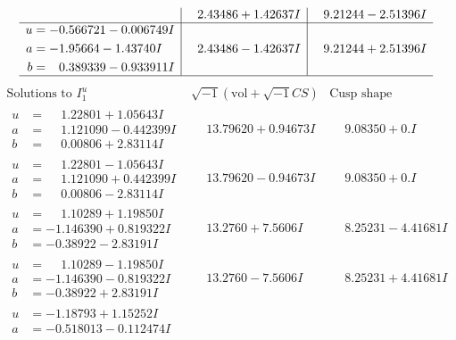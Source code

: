 \documentclass[1p]{elsarticle_modified}
\theoremstyle{definition}
\newcommand{\I}{\sqrt{-1}}
\begin{document}
$$\begin{array}{c|c|c}
 & \phantom{-}2.43486 + 1.42637 I & \phantom{-}9.21244 - 2.51396 I \\ \hline\begin{aligned}
u &= -0.566721 - 0.006749 I \\
a &= -1.95664 - 1.43740 I \\
b &= \phantom{-}0.389339 - 0.933911 I\end{aligned}
 & \phantom{-}2.43486 - 1.42637 I & \phantom{-}9.21244 + 2.51396 I\\
 \hline 
 \end{array}$$\newpage$$\begin{array}{c|c|c}  
\text{Solutions to }I^u_{1}& \I (\text{vol} + \sqrt{-1}CS) & \text{Cusp shape}\\
 \hline 
\begin{aligned}
u &= \phantom{-}1.22801 + 1.05643 I \\
a &= \phantom{-}1.121090 - 0.442399 I \\
b &= \phantom{-}0.00806 + 2.83114 I\end{aligned}
 & \phantom{-}13.79620 + 0.94673 I & \phantom{-}9.08350 + 0. I\phantom{ +0.000000I} \\ \hline\begin{aligned}
u &= \phantom{-}1.22801 - 1.05643 I \\
a &= \phantom{-}1.121090 + 0.442399 I \\
b &= \phantom{-}0.00806 - 2.83114 I\end{aligned}
 & \phantom{-}13.79620 - 0.94673 I & \phantom{-}9.08350 + 0. I\phantom{ +0.000000I} \\ \hline\begin{aligned}
u &= \phantom{-}1.10289 + 1.19850 I \\
a &= -1.146390 + 0.819322 I \\
b &= -0.38922 - 2.83191 I\end{aligned}
 & \phantom{-}13.2760 + 7.5606 I & \phantom{-}8.25231 - 4.41681 I \\ \hline\begin{aligned}
u &= \phantom{-}1.10289 - 1.19850 I \\
a &= -1.146390 - 0.819322 I \\
b &= -0.38922 + 2.83191 I\end{aligned}
 & \phantom{-}13.2760 - 7.5606 I & \phantom{-}8.25231 + 4.41681 I \\ \hline\begin{aligned}
u &= -1.18793 + 1.15252 I \\
a &= -0.518013 - 0.112474 I \\

\end{aligned}
\end{array}$$
\end{document}
